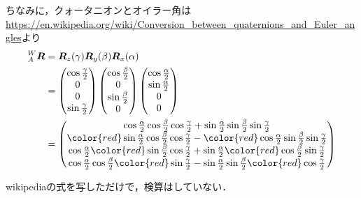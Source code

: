 ちなみに，クォータニオンとオイラー角は \url{https://en.wikipedia.org/wiki/Conversion_between_quaternions_and_Euler_angles}より
\begin{align}
  {}^{W}_{A}\boldsymbol{R} &= \boldsymbol{R}_{z}(\gamma) \boldsymbol{R}_{y}(\beta) \boldsymbol{R}_{x}(\alpha)\\
  &=
  \begin{pmatrix}
    \cos \frac{\gamma}{2}\\
    0\\
    0\\
    \sin \frac{\gamma}{2}
  \end{pmatrix}
  \begin{pmatrix}
    \cos \frac{\beta}{2}\\
    0\\
    \sin \frac{\beta}{2}\\
    0
  \end{pmatrix}
  \begin{pmatrix}
    \cos \frac{\alpha}{2}\\
    \sin \frac{\alpha}{2}\\
    0\\
    0
  \end{pmatrix}\\
  &=
  \begin{pmatrix}
    \cos \frac{\alpha}{2} \cos \frac{\beta}{2} \cos \frac{\gamma}{2} + \sin \frac{\alpha}{2} \sin \frac{\beta}{2} \sin \frac{\gamma}{2}\\
         {\color{red} \sin \frac{\alpha}{2}} \cos \frac{\beta}{2} \cos \frac{\gamma}{2} - {\color{red} \cos \frac{\alpha}{2}} \sin \frac{\beta}{2} \sin \frac{\gamma}{2}\\
         \cos \frac{\alpha}{2} {\color{red} \sin \frac{\beta}{2}} \cos \frac{\gamma}{2} + \sin \frac{\alpha}{2} {\color{red} \cos \frac{\beta}{2}} \sin \frac{\gamma}{2}\\
         \cos \frac{\alpha}{2} \cos \frac{\beta}{2} {\color{red} \sin \frac{\gamma}{2}} - \sin \frac{\alpha}{2} \sin \frac{\beta}{2} {\color{red} \cos \frac{\gamma}{2}}
  \end{pmatrix}
\end{align}

wikipediaの式を写しただけで，検算はしていない．

